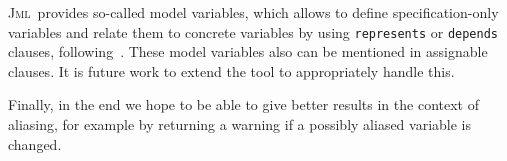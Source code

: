 \documentclass[a4paper]{llncs}
\newcommand{\jml}{\textsc{Jml}}
\begin{document}
\jml\ provides so-called model variables, which allows to define
specification-only variables and relate them to concrete variables by
using \texttt{represents} or \texttt{depends} clauses,
following~\cite{Leino98}. These model variables also can be mentioned
in assignable clauses. It is future work to extend the tool to
appropriately handle this.


Finally, in the end we hope to be able to give better results in the
context of aliasing, for example by returning a warning if a possibly
aliased variable is changed.



\end{document}
